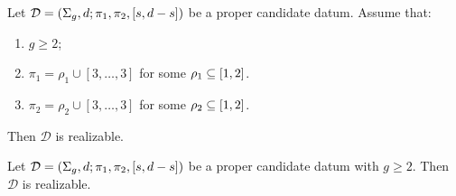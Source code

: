 \documentclass{article}
\begin{document}
\begin{lemma}\label{th:exceptional-n3-special-family}
Let $\mathcal{D}=\left(\Sigma_g,d;\pi_1,\pi_2,[s,d-s]\right)$ be a proper candidate datum. Assume that:
\begin{enumerate}
\item $g\ge 2$;
\item $\pi_1=\rho_1\cup[3,\ldots,3]$ for some $\rho_1\subseteq[1,2]$.
\item $\pi_2=\rho_2\cup[3,\ldots,3]$ for some $\rho_2\subseteq[1,2]$.
\end{enumerate}
Then $\mathcal{D}$ is realizable.
\end{lemma}

\begin{theorem}
Let $\mathcal{D}=\left(\Sigma_g,d;\pi_1,\pi_2,[s,d-s]\right)$ be a proper candidate datum with $g\ge 2$. Then $\mathcal{D}$ is realizable.
\end{theorem}
\end{document}
